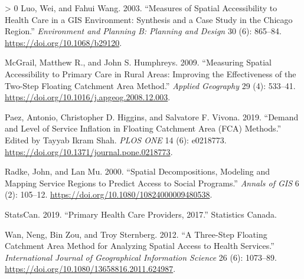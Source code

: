 \documentclass{article}
\newlength{\cslhangindent}
\newenvironment{CSLReferences}[3] %
 {%
  \setlength{\parindent}{0pt}
  \ifodd #1 \everypar{\setlength{\hangindent}{\cslhangindent}}\ignorespaces\fi
  \ifnum #2 > 0
  \setlength{\parskip}{#2\baselineskip}
  \fi
 }%
 {}
\begin{document}
\begin{CSLReferences}{1}{0}
\leavevmode\hypertarget{ref-luo2003}{}%
Luo, Wei, and Fahui Wang. 2003. {``Measures of Spatial Accessibility to
Health Care in a GIS Environment: Synthesis and a Case Study in the
Chicago Region.''} \emph{Environment and Planning B: Planning and
Design} 30 (6): 865--84. \url{https://doi.org/10.1068/b29120}.

\leavevmode\hypertarget{ref-mcgrail2009}{}%
McGrail, Matthew R., and John S. Humphreys. 2009. {``Measuring Spatial
Accessibility to Primary Care in Rural Areas: Improving the
Effectiveness of the Two-Step Floating Catchment Area Method.''}
\emph{Applied Geography} 29 (4): 533--41.
\url{https://doi.org/10.1016/j.apgeog.2008.12.003}.

\leavevmode\hypertarget{ref-paez2019}{}%
Paez, Antonio, Christopher D. Higgins, and Salvatore F. Vivona. 2019.
{``Demand and Level of Service Inflation in Floating Catchment Area
(FCA) Methods.''} Edited by Tayyab Ikram Shah. \emph{PLOS ONE} 14 (6):
e0218773. \url{https://doi.org/10.1371/journal.pone.0218773}.

\leavevmode\hypertarget{ref-radke2000}{}%
Radke, John, and Lan Mu. 2000. {``Spatial Decompositions, Modeling and
Mapping Service Regions to Predict Access to Social Programs.''}
\emph{Annals of GIS} 6 (2): 105--12.
\url{https://doi.org/10.1080/10824000009480538}.

\leavevmode\hypertarget{ref-statcan2019}{}%
StatsCan. 2019. {``Primary Health Care Providers, 2017.''} Statistics
Canada.

\leavevmode\hypertarget{ref-wan2012}{}%
Wan, Neng, Bin Zou, and Troy Sternberg. 2012. {``A Three-Step Floating
Catchment Area Method for Analyzing Spatial Access to Health
Services.''} \emph{International Journal of Geographical Information
Science} 26 (6): 1073--89.
\url{https://doi.org/10.1080/13658816.2011.624987}.

\end{CSLReferences}



\end{document}
